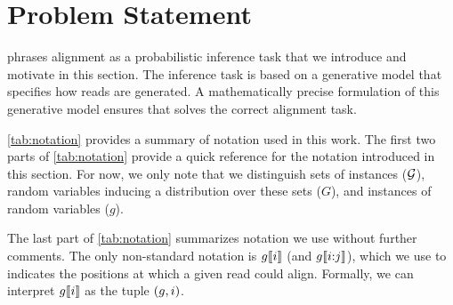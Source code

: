 \section{Problem Statement} \label{sec:problem-statement}

\tool phrases alignment as a probabilistic inference task that we introduce and motivate in this section. The inference task is based on a generative model that specifies how reads are generated. A mathematically precise formulation of this generative model ensures that \tool solves the correct alignment task.

\cref{tab:notation} provides a summary of notation used in this work.
The first two parts of \cref{tab:notation} provide a quick reference for the notation introduced in this section.
For now, we only note that we distinguish sets of instances (\eg $\mathcal{G}$), random variables inducing a distribution over these sets (\eg $G$), and instances of random variables (\eg $g$).

The last part of \cref{tab:notation} summarizes notation we use without further comments.
The only non-standard notation is $g\llbracket i \rrbracket$ (and $g\llbracket i {:} j \rrbracket$), which we use to indicates the positions at which a given read could align.
Formally, we can interpret $g\llbracket i \rrbracket$ as the tuple $(g,i)$.




